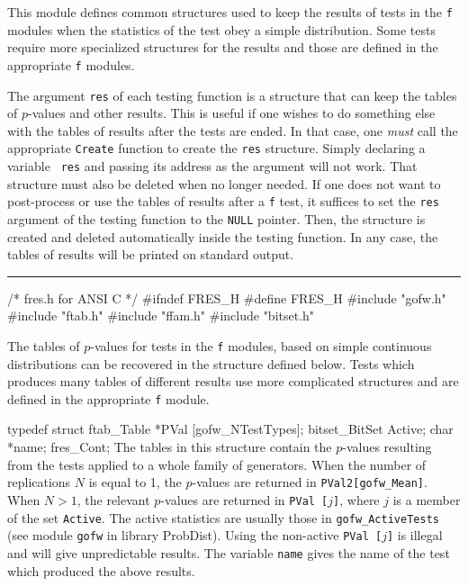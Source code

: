 
This module defines common structures used to keep the results of tests
in the {\tt f} modules when the statistics of the test obey a
simple distribution. Some tests require more specialized structures for
the results and those are defined in the appropriate {\tt f} modules.

The argument {\tt res} of each testing function is a structure 
 that can keep the tables of $p$-values and other results.
This is useful if one wishes to do something else with the tables of
results after the tests are ended. In that case, one 
{\it must} call the appropriate {\tt Create} function to create the
 {\tt res} structure. Simply declaring a variable  {\tt
res} and passing its address as the argument will not work.
That structure must also be deleted when no longer needed. If one does not
want to post-process or use the tables of results after a {\tt f} test,
it suffices to set the {\tt res} argument of the testing function
to the {\tt NULL} pointer.
Then, the structure is created and deleted automatically inside the 
testing function. In any case, the tables of results will be printed on 
standard output.

\bigskip
\hrule
\code
\hide
/* fres.h for ANSI C */
#ifndef FRES_H
#define FRES_H
\endhide
#include "gofw.h"
#include "ftab.h"
#include "ffam.h"
#include "bitset.h"
\endcode





The tables of $p$-values for tests in the {\tt f} modules, based on simple
continuous distributions can be recovered in the structure defined below.
Tests which produces many tables of different results use more complicated
structures and are defined in the appropriate {\tt f} module.

\code


typedef struct {
   ftab_Table *PVal [gofw_NTestTypes];
   bitset_BitSet Active;
   char *name;
} fres_Cont;
\endcode
 \tab
  The tables in this structure contain the $p$-values resulting from
  the tests applied to a whole family of generators.
  When the number of replications $N$ is equal to 1, the $p$-values
  are returned in {\tt PVal2[gofw\_Mean]}. When $N > 1$, the relevant
  $p$-values are returned in {\tt PVal [$j$]}, where  $j$ is a member
  of the set {\tt Active}. The active statistics are usually those
  in {\tt gofw\_ActiveTests} (see module {\tt gofw} in library
  ProbDist). Using the non-active {\tt PVal [$j$]} is illegal and will
  give unpredictable results. The variable 
 {\tt name} gives the name of the test which produced the above results.
 \endtab
\code


